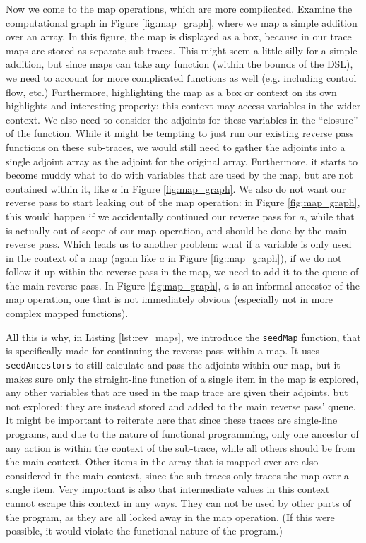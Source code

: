         Now we come to the map operations, which are more complicated.
        Examine the computational graph in Figure \ref{fig:map_graph}, where we map a simple addition over an array.
        In this figure, the map is displayed as a box, because in our trace maps are stored as separate sub-traces.
        This might seem a little silly for a simple addition, but since maps can take any function (within the bounds of the DSL), we need to account for more complicated functions as well (e.g. including control flow, etc.)
        Furthermore, highlighting the map as a box or context on its own highlights and interesting property: this context may access variables in the wider context.
        We also need to consider the adjoints for these variables in the ``closure'' of the function.
        While it might be tempting to just run our existing reverse pass functions on these sub-traces, we would still need to gather the adjoints into a single adjoint array as the adjoint for the original array.
        Furthermore, it starts to become muddy what to do with variables that are used by the map, but are not contained within it, like $a$ in Figure \ref{fig:map_graph}.
        We also do not want our reverse pass to start leaking out of the map operation: in Figure \ref{fig:map_graph}, this would happen if we accidentally continued our reverse pass for $a$, while that is actually out of scope of our map operation, and should be done by the main reverse pass.
        Which leads us to another problem: what if a variable is only used in the context of a map (again like $a$ in Figure \ref{fig:map_graph}), if we do not follow it up within the reverse pass in the map, we need to add it to the queue of the main reverse pass.
        In Figure \ref{fig:map_graph}, $a$ is an informal ancestor of the map operation, one that is not immediately obvious (especially not in more complex mapped functions).
        
        All this is why, in Listing \ref{lst:rev_maps}, we introduce the \texttt{seedMap} function, that is specifically made for continuing the reverse pass within a map.
        It uses \texttt{seedAncestors} to still calculate and pass the adjoints within our map, but it makes sure only the straight-line function of a single item in the map is explored, any other variables that are used in the map trace are given their adjoints, but not explored: they are instead stored and added to the main reverse pass' queue.
        It might be important to reiterate here that since these traces are single-line programs, and due to the nature of functional programming, only one ancestor of any action is within the context of the sub-trace, while all others should be from the main context.
        Other items in the array that is mapped over are also considered in the main context, since the sub-traces only traces the map over a single item.
        Very important is also that intermediate values in this context cannot escape this context in any ways.
        They can not be used by other parts of the program, as they are all locked away in the map operation.
        (If this were possible, it would violate the functional nature of the program.)

